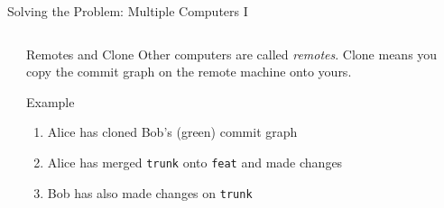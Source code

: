 \documentclass[xetex, handout]{beamer}
\begin{document}
\begin{frame}[fragile]{Solving the Problem: Multiple Computers I}
\begin{columns}
\begin{column}{.6\linewidth}
    \end{column}
    \begin{column}{.4\linewidth}
      \begin{block}{Remotes and Clone}
        \footnotesize
        Other computers are called \emph{remotes}. Clone means you copy the
        commit graph on the remote machine onto yours.
      \end{block}
      \begin{exampleblock}{Example}
        \footnotesize
        \begin{enumerate}
          \item Alice has cloned Bob's (green) commit graph 
          \item Alice has merged \texttt{trunk} onto \texttt{feat} and made changes
          \item Bob has also made changes on \texttt{trunk}
        \end{enumerate}
      \end{exampleblock}
    \end{column}
  \end{columns}
\end{frame}
\end{document}
